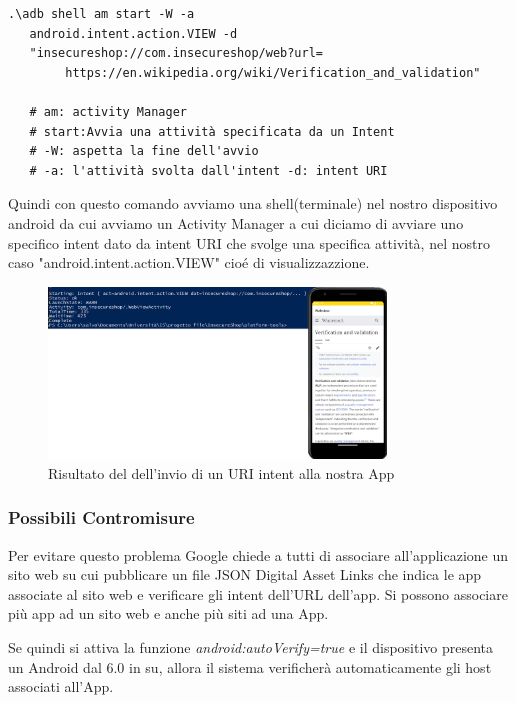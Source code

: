 \documentclass{article}
\begin{document}
\begin{verbatim}
.\adb shell am start -W -a 
   android.intent.action.VIEW -d 
   "insecureshop://com.insecureshop/web?url=
        https://en.wikipedia.org/wiki/Verification_and_validation"

   # am: activity Manager
   # start:Avvia una attività specificata da un Intent 
   # -W: aspetta la fine dell'avvio
   # -a: l'attività svolta dall'intent -d: intent URI 
\end{verbatim}
Quindi con questo comando avviamo una shell(terminale) nel nostro dispositivo android da cui avviamo un Activity Manager a cui diciamo di 
avviare uno specifico intent dato da intent URI che svolge una specifica attività, nel nostro caso "android.intent.action.VIEW" cioé di 
visualizzazzione.
\begin{figure}[htp]
    \centering
    \includegraphics[width=0.8\textwidth]{./insecureshop/URIOutput.png}
    \captionsetup{labelformat=empty}
    \caption{Risultato del dell'invio di un URI intent alla nostra App}
    \label{fig:URIntent}
\end{figure}

\subsubsection*{Possibili Contromisure}
Per evitare questo problema Google chiede a tutti di associare all'applicazione un sito web su cui pubblicare un file JSON 
Digital Asset Links che indica le app associate al sito web e verificare gli intent dell'URL dell'app. Si possono associare 
più app ad un sito web e anche più siti ad una App. 

Se quindi si attiva la funzione \emph{android:autoVerify=true} e il dispositivo presenta un Android dal 6.0 in su, allora 
il sistema verificherà automaticamente gli host associati all'App.\cite{webAssoc}
\end{document}
